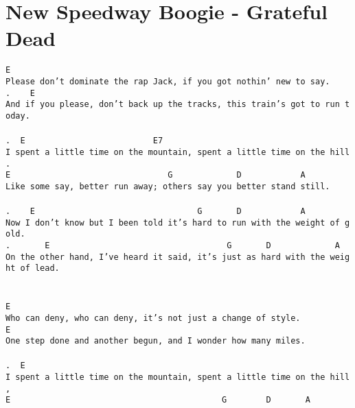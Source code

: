 \newpage
\section{New Speedway Boogie - Grateful Dead}
\label{New Speedway Boogie - Grateful Dead}
\texttt{E\\
Please\ don't\ dominate\ the\ rap\ Jack,\ if\ you\ got\ nothin'\ new\ to\ say.\\
. \ \ \ E\\
And\ if\ you\ please,\ don't\ back\ up\ the\ tracks,\ this\ train's\ got\ to\ run\ today.\\
\\
. \ E\ \ \ \ \ \ \ \ \ \ \ \ \ \ \ \ \ \ \ \ \ \ \ \ \ \ E7\\
I\ spent\ a\ little\ time\ on\ the\ mountain,\ spent\ a\ little\ time\ on\ the\ hill.\\
E\ \ \ \ \ \ \ \ \ \ \ \ \ \ \ \ \ \ \ \ \ \ \ \ \ \ \ \ \ \ \ \ G\ \ \ \ \ \ \ \ \ \ \ \ \ D\ \ \ \ \ \ \ \ \ \ \ \ A\\
Like\ some\ say,\ better\ run\ away;\ others\ say\ you\ better\ stand\ still.\\
\\
. \ \ \ E\ \ \ \ \ \ \ \ \ \ \ \ \ \ \ \ \ \ \ \ \ \ \ \ \ \ \ \ \ \ \ \ \ G\ \ \ \ \ \ \ D\ \ \ \ \ \ \ \ \ \ \ \ A\\
Now\ I\ don't\ know\ but\ I\ been\ told\ it's\ hard\ to\ run\ with\ the\ weight\ of\ gold.\\
. \ \ \ \ \ \ E\ \ \ \ \ \ \ \ \ \ \ \ \ \ \ \ \ \ \ \ \ \ \ \ \ \ \ \ \ \ \ \ \ \ \ \ G\ \ \ \ \ \ \ D\ \ \ \ \ \ \ \ \ \ \ \ \ A\\
On\ the\ other\ hand,\ I've\ heard\ it\ said,\ it's\ just\ as\ hard\ with\ the\ weight\ of\ lead.\\
\\
\\
E\\
Who\ can\ deny,\ who\ can\ deny,\ it's\ not\ just\ a\ change\ of\ style.\\
E\\
One\ step\ done\ and\ another\ begun,\ and\ I\ wonder\ how\ many\ miles.\\
\\
. \ E\\
I\ spent\ a\ little\ time\ on\ the\ mountain,\ spent\ a\ little\ time\ on\ the\ hill,\\
E\ \ \ \ \ \ \ \ \ \ \ \ \ \ \ \ \ \ \ \ \ \ \ \ \ \ \ \ \ \ \ \ \ \ \ \ \ \ \ \ \ \ \ G\ \ \ \ \ \ \ \ D\ \ \ \ \ \ \ A\\
}
